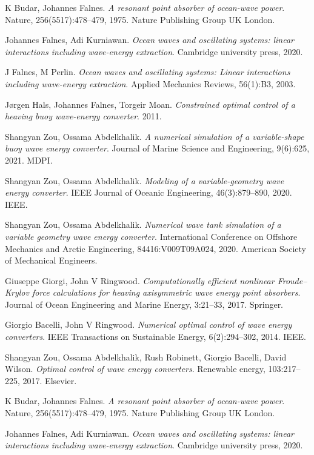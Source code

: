 \documentclass{article}
\begin{document}
\begin{thebibliography}{99}
K Budar, Johannes Falnes.
\textit{A resonant point absorber of ocean-wave power}.
Nature, 256(5517):478--479, 1975.
Nature Publishing Group UK London.

Johannes Falnes, Adi Kurniawan.
\textit{Ocean waves and oscillating systems: linear interactions including wave-energy extraction}.
Cambridge university press, 2020.

J Falnes, M Perlin.
\textit{Ocean waves and oscillating systems: Linear interactions including wave-energy extraction}.
Applied Mechanics Reviews, 56(1):B3, 2003.

Jørgen Hals, Johannes Falnes, Torgeir Moan.
\textit{Constrained optimal control of a heaving buoy wave-energy converter}.
2011.

Shangyan Zou, Ossama Abdelkhalik.
\textit{A numerical simulation of a variable-shape buoy wave energy converter}.
Journal of Marine Science and Engineering, 9(6):625, 2021.
MDPI.

Shangyan Zou, Ossama Abdelkhalik.
\textit{Modeling of a variable-geometry wave energy converter}.
IEEE Journal of Oceanic Engineering, 46(3):879--890, 2020.
IEEE.

Shangyan Zou, Ossama Abdelkhalik.
\textit{Numerical wave tank simulation of a variable geometry wave energy converter}.
International Conference on Offshore Mechanics and Arctic Engineering, 84416:V009T09A024, 2020.
American Society of Mechanical Engineers.

Giuseppe Giorgi, John V Ringwood.
\textit{Computationally efficient nonlinear Froude--Krylov force calculations for heaving axisymmetric wave energy point absorbers}.
Journal of Ocean Engineering and Marine Energy, 3:21--33, 2017.
Springer.

Giorgio Bacelli, John V Ringwood.
\textit{Numerical optimal control of wave energy converters}.
IEEE Transactions on Sustainable Energy, 6(2):294--302, 2014.
IEEE.

Shangyan Zou, Ossama Abdelkhalik, Rush Robinett, Giorgio Bacelli, David Wilson.
\textit{Optimal control of wave energy converters}.
Renewable energy, 103:217--225, 2017.
Elsevier.

K Budar, Johannes Falnes.
\textit{A resonant point absorber of ocean-wave power}.
Nature, 256(5517):478--479, 1975.
Nature Publishing Group UK London.

Johannes Falnes, Adi Kurniawan.
\textit{Ocean waves and oscillating systems: linear interactions including wave-energy extraction}.
Cambridge university press, 2020.


\end{thebibliography}
\end{document}
